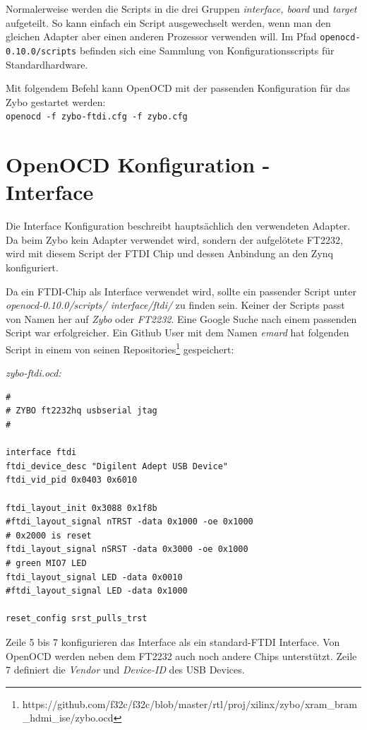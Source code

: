 Normalerweise werden die Scripts in die drei Gruppen \textit{interface, board} und \textit{target} aufgeteilt.
So kann einfach ein Script ausgewechselt werden, wenn man den gleichen Adapter aber einen anderen Prozessor verwenden will.
Im Pfad \texttt{openocd-0.10.0/scripts} befinden sich eine Sammlung von Konfigurationsscripts für Standardhardware.

Mit folgendem Befehl kann OpenOCD mit der passenden Konfiguration für das Zybo gestartet werden:\\
\texttt{openocd -f zybo-ftdi.cfg -f zybo.cfg}


\section{OpenOCD Konfiguration - Interface}
Die Interface Konfiguration beschreibt hauptsächlich den verwendeten Adapter.
Da beim Zybo kein Adapter verwendet wird, sondern der aufgelötete FT2232, wird mit diesem Script der FTDI Chip und dessen Anbindung an den Zynq konfiguriert.

Da ein FTDI-Chip als Interface verwendet wird, sollte ein passender Script unter \textit{openocd-0.10.0/scripts/ interface/ftdi/} zu finden sein.
Keiner der Scripts passt von Namen her auf \textit{Zybo} oder \textit{FT2232}.
Eine Google Suche nach einem passenden Script war erfolgreicher.
Ein Github User mit dem Namen \textit{emard} hat folgenden Script in einem von seinen Repositories\footnote{https://github.com/f32c/f32c/blob/master/rtl/proj/xilinx/zybo/xram\_bram\_hdmi\_ise/zybo.ocd} gespeichert:

\textit{zybo-ftdi.ocd:}
\lstset{language=tcl}
\begin{lstlisting}[frame=single]
#
# ZYBO ft2232hq usbserial jtag
#

interface ftdi
ftdi_device_desc "Digilent Adept USB Device"
ftdi_vid_pid 0x0403 0x6010

ftdi_layout_init 0x3088 0x1f8b
#ftdi_layout_signal nTRST -data 0x1000 -oe 0x1000
# 0x2000 is reset
ftdi_layout_signal nSRST -data 0x3000 -oe 0x1000
# green MIO7 LED
ftdi_layout_signal LED -data 0x0010
#ftdi_layout_signal LED -data 0x1000

reset_config srst_pulls_trst

\end{lstlisting}

Zeile 5 bis 7 konfigurieren das Interface als ein standard-FTDI Interface.
Von OpenOCD werden neben dem FT2232 auch noch andere Chips unterstützt.
Zeile 7 definiert die \textit{Vendor} und \textit{Device-ID} des USB Devices.


